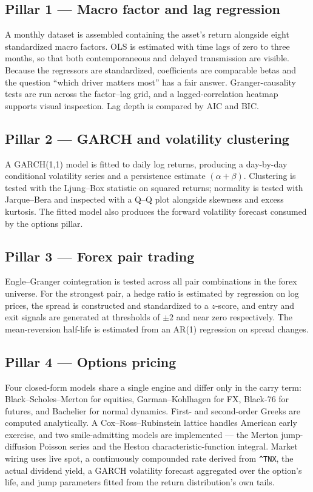 \documentclass[11pt,a4paper]{article}
\begin{document}
\subsection{Pillar 1 --- Macro factor and lag regression}

A monthly dataset is assembled containing the asset's return alongside eight standardized
macro factors. OLS is estimated with time lags of zero to three months, so that both
contemporaneous and delayed transmission are visible. Because the regressors are
standardized, coefficients are comparable betas and the question ``which driver matters
most'' has a fair answer. Granger-causality tests are run across the factor--lag grid, and
a lagged-correlation heatmap supports visual inspection. Lag depth is compared by AIC and
BIC.

\subsection{Pillar 2 --- GARCH and volatility clustering}

A GARCH(1,1) model is fitted to daily log returns, producing a day-by-day conditional
volatility series and a persistence estimate $(\alpha + \beta)$. Clustering is tested with
the Ljung--Box statistic on squared returns; normality is tested with Jarque--Bera and
inspected with a Q--Q plot alongside skewness and excess kurtosis. The fitted model also
produces the forward volatility forecast consumed by the options pillar.

\subsection{Pillar 3 --- Forex pair trading}

Engle--Granger cointegration is tested across all pair combinations in the forex universe.
For the strongest pair, a hedge ratio is estimated by regression on log prices, the spread
is constructed and standardized to a $z$-score, and entry and exit signals are generated at
thresholds of $\pm 2$ and near zero respectively. The mean-reversion half-life is estimated
from an AR(1) regression on spread changes.

\subsection{Pillar 4 --- Options pricing}

Four closed-form models share a single engine and differ only in the carry term:
Black--Scholes--Merton for equities, Garman--Kohlhagen for FX, Black-76 for futures, and
Bachelier for normal dynamics. First- and second-order Greeks are computed analytically. A
Cox--Ross--Rubinstein lattice handles American early exercise, and two smile-admitting
models are implemented --- the Merton jump-diffusion Poisson series and the Heston
characteristic-function integral. Market wiring uses live spot, a continuously compounded
rate derived from \verb|^TNX|, the actual dividend yield, a GARCH volatility forecast
aggregated over the option's life, and jump parameters fitted from the return
distribution's own tails.
\end{document}
